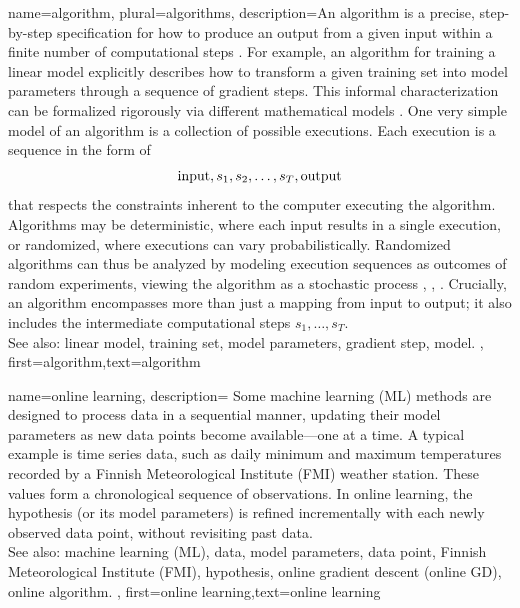 {name={algorithm}, plural={algorithms},
  description={An algorithm is a precise, step-by-step specification for 
  	how to produce an output from a given input within a finite number of computational steps \cite{Cormen:2022aa}. 
    For example, an algorithm for training a linear model explicitly describes how to 
	transform a given training set into model parameters through a sequence of gradient steps. 
    This informal characterization can be formalized rigorously via different mathematical models \cite{Sipser2013}. 
    One very simple model of an algorithm is a collection of possible executions. Each execution is a sequence in the form of
    $${\rm input},s_1,s_2,\ldots,s_T,{\rm output}$$ 
    that respects the constraints inherent to the computer executing the algorithm.
	Algorithms may be deterministic, where each input results in a single execution,
	or randomized, where executions can vary probabilistically. Randomized algorithms 
	can thus be analyzed by modeling execution sequences as outcomes of random experiments, 
	viewing the algorithm as a stochastic process \cite{BertsekasProb}, \cite{RandomizedAlgos}, \cite{Gallager13}.
	Crucially, an algorithm encompasses more than just a mapping from input to output; it also includes 
	the intermediate computational steps $s_1,\ldots,s_T$. 
				\\ 
		See also: linear model, training set, model parameters, gradient step, model.
	},
	first={algorithm},text={algorithm} 
}

{name={online learning},
	description={
		Some machine learning (ML) methods  are designed to process data in a sequential 
		manner, updating their model parameters as new data points become available—one at a time. 
		A typical example is time series data, such as daily minimum and maximum temperatures 
		recorded by a Finnish Meteorological Institute (FMI) weather station. These values form a chronological sequence 
		of observations. In online learning, the hypothesis (or its model parameters) is refined 
		incrementally with each newly observed data point, without revisiting past data.  \\ 
		See also: machine learning (ML), data, model parameters, data point, Finnish Meteorological Institute (FMI), hypothesis, online gradient descent (online GD), online algorithm. 
	},
	first={online learning},text={online learning} 
}

